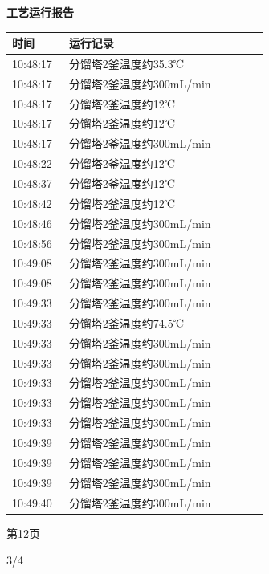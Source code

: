 \documentclass[UTF8,10pt,a4paper,fontset=fandol]{ctexart}
\newcommand{\handwritten}[1]{#1}
\begin{document}
\begin{minipage}[t]{0.47\linewidth}
\centering
\textbf{工艺运行报告}

\vspace{2mm}
\scriptsize
\begin{tabular}{|p{0.20\linewidth}|p{0.70\linewidth}|}
\hline
时间 & 运行记录 \\ \hline
10:48:17 & 分馏塔2釜温度约35.3℃ \\ \hline
10:48:17 & 分馏塔2釜温度约300mL/min \\ \hline
10:48:17 & 分馏塔2釜温度约12℃ \\ \hline
10:48:17 & 分馏塔2釜温度约12℃ \\ \hline
10:48:17 & 分馏塔2釜温度约300mL/min \\ \hline
10:48:22 & 分馏塔2釜温度约12℃ \\ \hline
10:48:37 & 分馏塔2釜温度约12℃ \\ \hline
10:48:42 & 分馏塔2釜温度约12℃ \\ \hline
10:48:46 & 分馏塔2釜温度约300mL/min \\ \hline
10:48:56 & 分馏塔2釜温度约300mL/min \\ \hline
10:49:08 & 分馏塔2釜温度约300mL/min \\ \hline
10:49:08 & 分馏塔2釜温度约300mL/min \\ \hline
10:49:33 & 分馏塔2釜温度约300mL/min \\ \hline
10:49:33 & 分馏塔2釜温度约74.5℃ \\ \hline
10:49:33 & 分馏塔2釜温度约300mL/min \\ \hline
10:49:33 & 分馏塔2釜温度约300mL/min \\ \hline
10:49:33 & 分馏塔2釜温度约300mL/min \\ \hline
10:49:33 & 分馏塔2釜温度约300mL/min \\ \hline
10:49:33 & 分馏塔2釜温度约300mL/min \\ \hline
10:49:39 & 分馏塔2釜温度约300mL/min \\ \hline
10:49:39 & 分馏塔2釜温度约300mL/min \\ \hline
10:49:39 & 分馏塔2釜温度约300mL/min \\ \hline
10:49:40 & 分馏塔2釜温度约300mL/min \\ \hline
\end{tabular}

\vspace{1mm}

第12页

\handwritten{3/4}
\end{minipage}
\end{document}
